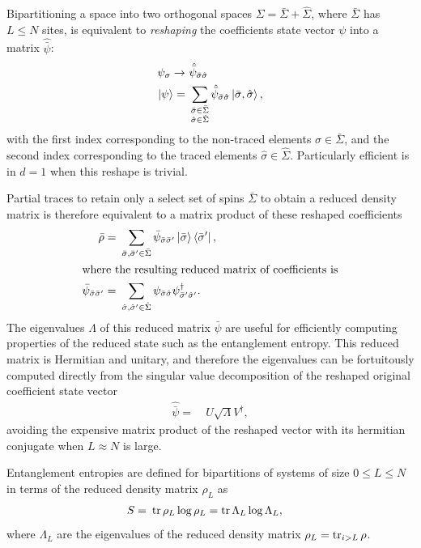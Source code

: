 \documentclass[12pt]{article}{}
\begin{document}
Bipartitioning a space into two orthogonal spaces $\Sigma = \bar{\Sigma} + \hat{\Sigma}$, where $\bar{\Sigma}$ has $L\leq N$ sites, is equivalent to \emph{reshaping} the coefficients state vector $\psi$ into a matrix $\hat{\bar{\psi}}$:
\begin{align}
  \psi_{\sigma} \to&~ \hat{\bar{\psi}}_{\bar{\sigma}\hat{\sigma}} \\
  \ket{\psi} =&~ \sum_{\substack{\bar{\sigma} \in \bar\Sigma \\\hat{\sigma} \in \hat{\Sigma}}} \hat{\bar{\psi}}_{\bar{\sigma}\hat{\sigma}} \ket{\bar{\sigma},\hat{\sigma}},
\end{align}
with the first index corresponding to the non-traced elements $\sigma \in \bar{\Sigma}$, and the second index corresponding to the traced elements $\hat{\sigma} \in \hat{\Sigma}$. Particularly efficient is in $d=1$ when this reshape is trivial.

Partial traces to retain only a select set of spins $\bar{\Sigma}$ to obtain a reduced density matrix is therefore equivalent to a matrix product of these reshaped coefficients
\begin{align}
  \bar{\rho} =&~ \sum_{\bar{\sigma},\bar{\sigma}^{\prime} \in \bar{\Sigma}} \bar{\psi}_{\bar{\sigma}\bar{\sigma}^{\prime}} \ket{\bar{\sigma}}\bra{\bar{\sigma}^{\prime}}, \label{eq:reduced_rho}\\
  \intertext{where the resulting reduced matrix of coefficients is}
  \bar{\psi}_{\bar{\sigma}\bar{\sigma}^{\prime}} =&~ \sum_{\hat{\sigma},\hat{\sigma}^{\prime} \in \hat{\Sigma}} \psi_{\bar{\sigma}\hat{\sigma}} \psi_{\bar{\sigma}^{\prime}\hat{\sigma}^{\prime}}^{\dagger}.
\end{align}
The eigenvalues $\Lambda$ of this reduced matrix $\bar{\psi}$ are useful for efficiently computing properties of the reduced state such as the entanglement entropy. This reduced matrix is Hermitian and unitary, and therefore the eigenvalues can be fortuitously computed directly from the singular value decomposition of the reshaped original coefficient state vector
\begin{align}
  \hat{\bar{\psi}} =&~ U \sqrt{\Lambda} V^{\dagger}, \label{eq:svd}
\end{align}
avoiding the expensive matrix product of the reshaped vector with its hermitian conjugate when $L \approx N$ is large.

Entanglement entropies are defined for bipartitions of systems of size $0 \leq L \leq N$ in terms of the reduced density matrix $\rho_{L}$ as
\begin{align}
  S =&~ \tr \rho_L \log \rho_L = \tr \Lambda_L \log \Lambda_L,
\end{align}
where $\Lambda_L$ are the eigenvalues of the reduced density matrix $\rho_L = \tr_{i>L} \rho$.
\end{document}
